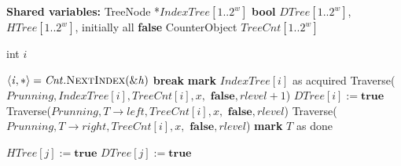 \begin{algorithm}[htbp]
    \footnotesize
    \vspace*{2mm}
    
    \begin{algorithmic}[1]
    
    \State \textbf{Shared variables:}
    \State TreeNode *$\mathit{IndexTree}[1..2^w]$ \label{alg:ps:r}
    \State \textbf{bool} $\mathit{DTree[1..2^w]}$, $\mathit{HTree[1..2^w]}$, initially all \textbf{false} \label{alg:ps:c}
    \State CounterObject $\mathit{TreeCnt[1..2^w]}$
    
    \vspace*{1mm}
        \State int $\mathit{i}$
    
            \State $\mathit{\langle i, * \rangle = Cnt.\mbox{\sc NextIndex}(\&h)}$ \label{alg:ps:help:c:cnt}
                \State \textbf{break}
            \EndIf
                \State \textbf{mark} $\mathit{IndexTree[i]}$ as acquired
                \State Traverse($\mathit{Prunning, IndexTree[i], TreeCnt[i], x,}$
                \Statex \quad $\mathit{\textbf{false}, rlevel+1}$) \label{alg:ps:help:c:rec}                
                \State $\mathit{DTree[i] := \textbf{true}}$ \label{alg:ps:help:c:true}
            \Else
                \State {} \label{alg:ps:prunning}
                \State Traverse($\mathit{Prunning, T \rightarrow left, TreeCnt[i], x,}$
                \Statex \quad $\mathit{\textbf{false}, rlevel}$) \label{alg:ps:rec:left-child}
                \State Traverse($\mathit{Prunning, T\rightarrow right, TreeCnt[i], x,}$
                \Statex \quad $\mathit{\textbf{false}, rlevel}$) \label{alg:ps:rec:right-child}
                \State \textbf{mark} $\mathit{T}$ as done
            \EndIf
        \EndWhile
    
         \label{alg:ps:scan:for}
            \State {}  \label{alg:ps:help:backoff}
             \label{alg:ps:help:if}
                \State $\mathit{HTree[j] := \textbf{true}}$ \label{alg:ps:h:true}
                \State {}
            \EndIf
            \State $\mathit{DTree[j] := \textbf{true}}$ \label{alg:ps:help:c:true:helping}
        \EndFor
    \EndProcedure
    

\end{algorithmic}
\end{algorithm}
